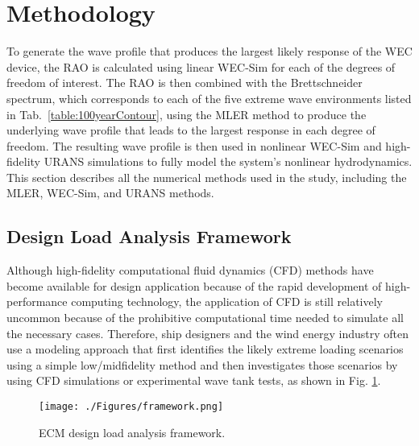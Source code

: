 \section{Methodology}

To generate the wave profile that produces the largest likely response of the WEC device, the RAO is calculated using linear WEC-Sim for each of the degrees of freedom of interest. The RAO is then combined with the Brettschneider spectrum, which corresponds to each of the five extreme wave environments listed in Tab.~\ref{table:100yearContour}, using the MLER method to produce the underlying wave profile that leads to the largest response in each degree of freedom. The resulting wave profile is then used in nonlinear WEC-Sim and high-fidelity URANS simulations to fully model the system's nonlinear hydrodynamics. This section describes all the numerical methods used in the study, including the MLER, WEC-Sim, and URANS methods.

\subsection{Design Load Analysis Framework}
Although high-fidelity computational fluid dynamics (CFD) methods have become available for design application because of the rapid development of high-performance computing technology, the application of CFD is still relatively uncommon because of the prohibitive computational time needed to simulate all the necessary cases. Therefore, ship designers and the wind energy industry often use a modeling approach that first identifies the likely extreme loading scenarios using a simple low/midfidelity method and then investigates those scenarios by using CFD simulations or experimental wave tank tests, as shown in Fig. \ref{fig:framework}.

\begin{figure}[htbp]
\begin{center}
\texttt{[image: ./Figures/framework.png]}
\end{center}
\caption{ECM design load analysis framework.}
\label{fig:framework}
\end{figure}

